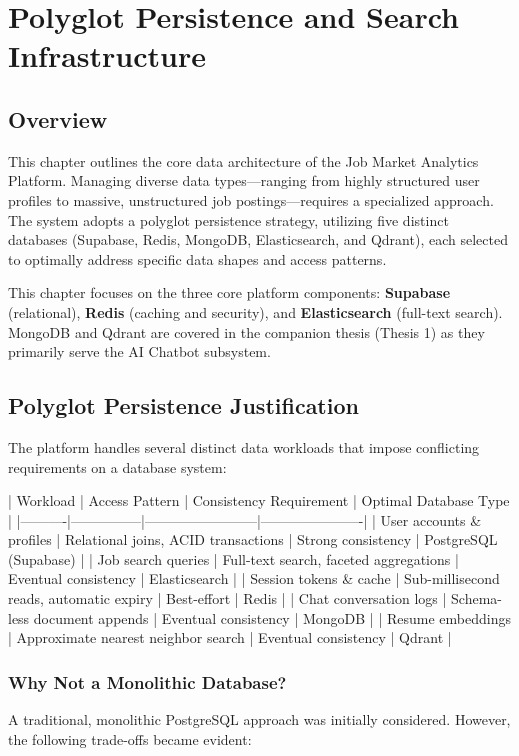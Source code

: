 \chapter{Polyglot Persistence and Search Infrastructure}

\section{Overview}
This chapter outlines the core data architecture of the Job Market Analytics Platform. Managing diverse data types—ranging from highly structured user profiles to massive, unstructured job postings—requires a specialized approach. The system adopts a polyglot persistence strategy, utilizing five distinct databases (Supabase, Redis, MongoDB, Elasticsearch, and Qdrant), each selected to optimally address specific data shapes and access patterns.

This chapter focuses on the three core platform components: \textbf{Supabase} (relational), \textbf{Redis} (caching and security), and \textbf{Elasticsearch} (full-text search). MongoDB and Qdrant are covered in the companion thesis (Thesis 1) as they primarily serve the AI Chatbot subsystem.

\section{Polyglot Persistence Justification}

The platform handles several distinct data workloads that impose conflicting requirements on a database system:

| Workload | Access Pattern | Consistency Requirement | Optimal Database Type |
|----------|---------------|------------------------|----------------------|
| User accounts \& profiles | Relational joins, ACID transactions | Strong consistency | PostgreSQL (Supabase) |
| Job search queries | Full-text search, faceted aggregations | Eventual consistency | Elasticsearch |
| Session tokens \& cache | Sub-millisecond reads, automatic expiry | Best-effort | Redis |
| Chat conversation logs | Schema-less document appends | Eventual consistency | MongoDB |
| Resume embeddings | Approximate nearest neighbor search | Eventual consistency | Qdrant |

\subsection{Why Not a Monolithic Database?}

A traditional, monolithic PostgreSQL approach was initially considered. However, the following trade-offs became evident:

